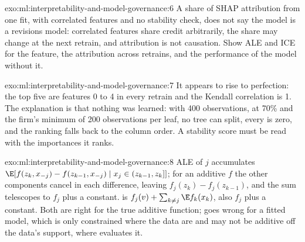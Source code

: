 \begin{solution}{exo:ml:interpretability-and-model-governance:6}
A share of SHAP attribution from one fit, with correlated features and no stability check, does not say the model is a
revisions model: correlated features share credit arbitrarily, the share may change at the next retrain, and attribution is
not causation. Show ALE and ICE for the feature, the attribution across retrains, and the performance of the model without it.
\end{solution}

\begin{solution}{exo:ml:interpretability-and-model-governance:7}
It appears to rise to perfection: the top five are features 0 to 4 in every retrain and the Kendall correlation is 1. The
explanation is that nothing was learned: with 400 observations,  at 70\% and the firm's minimum of 200 observations per
leaf, no tree can split, every  is zero, and the ranking falls back to the column order. A stability score must be read
with the importances it ranks.
\end{solution}

\begin{solution}{exo:ml:interpretability-and-model-governance:8}
ALE of $j$ accumulates $\E[f(z_{k}, x_{-j}) - f(z_{k-1}, x_{-j})\mid x_j\in(z_{k-1}, z_k]]$; for an additive $f$ the other
components cancel in each difference, leaving $f_j(z_k) - f_j(z_{k-1})$, and the sum telescopes to $f_j$ plus a constant.
 is $f_j(v) + \sum_{k\ne j}\E f_k(x_k)$, also $f_j$ plus a constant. Both are right for the true additive
function;  goes wrong for a fitted model, which is only constrained where the data are and may not be
additive off the data's support, where  evaluates it.
\end{solution}

